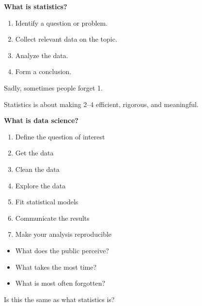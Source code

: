 \textbf{What is statistics?}
\begin{enumerate}
\item Identify a question or problem.
\item Collect relevant data on the topic.
\item Analyze the data.
\item Form a conclusion.
\end{enumerate}
Sadly, sometimes people forget 1.
  
Statistics is about making 2--4 efficient, rigorous, and meaningful.

\textbf{What is data science?}
\begin{enumerate}
\item Define the question of interest
\item Get the data
\item Clean the data
\item Explore the data
\item Fit statistical models
\item Communicate the results
\item Make your analysis reproducible
\end{enumerate}

\begin{itemize}
\item What does the public perceive?
\item What takes the most time?
\item What is most often forgotten?
\end{itemize}

Is this the same as what statistics is?

